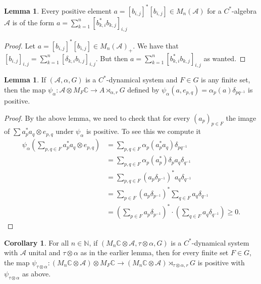 \documentclass[10pt,oneside,openany,final]{memoir}
\theoremstyle{definition}
\newtheorem{lemma}[theorem]{Lemma}
\newtheorem{corollary}[theorem]{Corollary}
\theoremstyle{Break}
\newcommand{\C}{\mathbb{C}}
\newcommand{\N}{\mathbb{N}}
\newcommand{\A}{\mathcal{A}}
\begin{document}
\begin{lemma}
Every positive element $a =[b_{i,j}]^*[b_{i,j}] \in M_{n}(\A)$ for a $C^*$-algebra $\A$ is of the form $a =\sum_{k=1}^n [b^*_{k,i}b_{k,j}]_{i,j}$
\begin{proof}
Let $a=[b_{i,j}]^*[b_{i,j}] \in M_{n}(\A)_{+}$. We have that $[b_{i,j}]_{i,j}=\sum_{k=1}^n [\delta_{k,i}b_{i,j}]_{i,j}$. But then $a=\sum_{k=1}^n [b^*_{k,i}b_{k,j}]_{i,j}$ as wanted.
\end{proof}
\end{lemma}

\begin{lemma}
If $(\A, \alpha, G)$ is a $C^*$-dynamical system and $F \in G$ is any finite set, then the map $\psi_{\alpha} \colon \A \otimes M_{F} \C \to A \rtimes_{\alpha,r} G $ defined by $\psi_{\alpha}(a,e_{p,q})=\alpha_{p}(a)\delta_{pq^{-1}}$ is positive.
\begin{proof}
By the above lemma, we need to check that for every $\left({a_{p}}\right)_{p \in F}$ the image of $\sum a_{p}^*a_{q} \otimes e_{p,q}$ under $\psi_{\alpha}$ is positive. To see this we compute it
\begin{align*}
\psi_{\alpha}\left(\sum_{p,q \in F}a_{p}^*a_{q} \otimes e_{p,q}\right)&=\sum_{p,q \in F}\alpha_{p}(a_{p}^*a_{q})\delta_{pq^{-1}}\\
&=\sum_{p,q \in F}\alpha_{p}(a_{p}^*)\delta_{p}a_{q}\delta_{q^{-1}}\\
&=\sum_{p,q \in F} (a_{p}\delta_{p^{-1}})^* a_{q} \delta_{q^{-1}}\\
&=\sum_{p \in F}(a_{p}\delta_{p^{-1}})^*\sum_{q \in F} a_{q}\delta_{q^{-1}}\\
&=\left(\sum_{p \in F}a_{p}\delta_{p^{-1}}\right)^* \cdot \left( \sum_{q \in F} a_{q} \delta_{q^{-1}}\right) \geq 0.
\end{align*}
\end{proof}
\end{lemma}

\begin{corollary}
For all $n \in \N$, if $(M_{n} \C \otimes \A, \tau\otimes\alpha,G)$ is a $C^*$-dynamical system with $\A$ unital and $\tau \otimes \alpha$ as in the earlier lemma, then for every finite set $F \in G$, the map $\psi_{\tau \otimes \alpha} \colon (M_{n} \C \otimes \A) \otimes M_{F} \C \to (M_{n} \C \otimes \A)\rtimes_{\tau \otimes \alpha,r}G$ is positive with $\psi_{\tau \otimes \alpha}$ as above.
\end{corollary}
\end{document}

